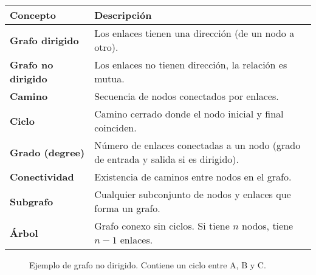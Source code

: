 \begin{center}
\begin{tabular}{@{}ll@{}}
\toprule
\textbf{Concepto} & \textbf{Descripción} \\
\midrule
\textbf{Grafo dirigido} & Los enlaces tienen una dirección (de un nodo a otro). \\
\textbf{Grafo no dirigido} & Los enlaces no tienen dirección, la relación es mutua. \\
\textbf{Camino} & Secuencia de nodos conectados por enlaces. \\
\textbf{Ciclo} & Camino cerrado donde el nodo inicial y final coinciden. \\
\textbf{Grado (degree)} & Número de enlaces conectadas a un nodo (grado de entrada y salida si es dirigido). \\
\textbf{Conectividad} & Existencia de caminos entre nodos en el grafo. \\
\textbf{Subgrafo} & Cualquier subconjunto de nodos y enlaces que forma un grafo. \\
\textbf{Árbol} & Grafo conexo sin ciclos. Si tiene \(n\) nodos, tiene \(n-1\) enlaces. \\
\bottomrule
\end{tabular}
\end{center}
\begin{figure}[H]
\centering
{}
\caption{Ejemplo de grafo no dirigido. Contiene un ciclo entre A, B y C.}
\end{figure}

